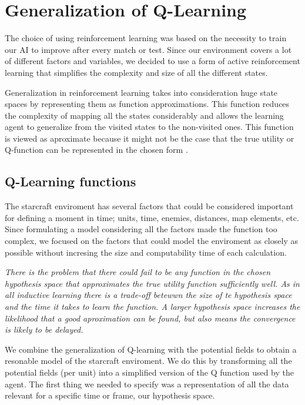 

\section{Generalization of Q-Learning}	\label{qlearning}

The choice of using reinforcement learning was based on the necessity to train our AI to improve after every match or test. Since our environment covers a lot of different factors and variables, we decided to use a form of active reinforcement learning that simplifies the complexity and size of all the different states. 

Generalization in reinforcement learning takes into consideration huge state spaces by representing them as function approximations. This function reduces the complexity of mapping all the states considerably and allows the learning agent to generalize from the visited states to the non-visited ones. This function is viewed as aproximate because it might not be the case that the true utility or Q-function can be represented in the chosen form \cite[p777]{rl}. 

\subsection{Q-Learning functions}

The starcraft enviroment has several factors that could be considered important for defining a moment in time; units, time, enemies, distances, map elements, etc. Since formulating a model considering all the factors made the function too complex, we focused on the factors that could model the enviroment as closely as possible without incresing the size and computability time of each calculation. 

\textit{There is the problem that there could fail to be any function in the chosen hypothesis space that approximates the true utility function sufficiently well. As in all inductive learning there is a trade-off betewwn the size of te hypothesis space and the time it takes to learn the function. A larger hypothesis space increases the likelihood that a good aproximation can be found, but also means the convergence is likely to be delayed.}\cite[p778]{rl}

We combine the generalization of Q-learning with the potential fields to obtain a resonable model of the starcraft enviroment. We do this by transforming all the potential fields (per unit) into a simplified version of the Q function used by the agent. The first thing we needed to specify was a representation of all the data relevant for a specific time or frame, our hypothesis space. 


